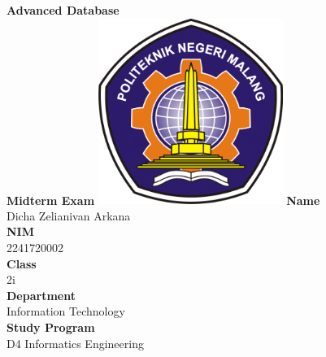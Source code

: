 \documentclass[12pt,titlepage]{article}
\newcommand{\vSubject}{Advanced Database}
\newcommand{\vSubtitle}{Midterm Exam}
\newcommand{\vName}{Dicha Zelianivan Arkana}
\newcommand{\vNIM}{2241720002}
\newcommand{\vClass}{2i}
\newcommand{\vDepartment}{Information Technology}
\newcommand{\vStudyProgram}{D4 Informatics Engineering}
\begin{document}
\begin{titlepage}
    \centering
    \vfill
    {\bfseries\LARGE
        \vSubject\\
        \vskip0.25cm
        \vSubtitle
    }
    \vfill
    \includegraphics[width=6cm]{images/polinema-logo.png}
    \vfill
    {
        \textbf{Name}\\
        \vName\\
        \vskip0.5cm
        \textbf{NIM}\\
        \vNIM\\
        \vskip0.5cm
        \textbf{Class}\\
        \vClass\\
        \vskip0.5cm
        \textbf{Department}\\
        \vDepartment\\
        \vskip0.5cm
        \textbf{Study Program}\\
        \vStudyProgram
    }
\end{titlepage}
\end{document}
